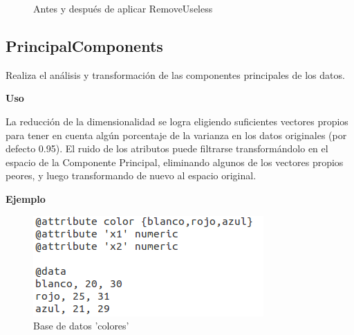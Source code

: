 	\begin{figure}[!htp]
	\centering
	\caption{Antes y después de aplicar RemoveUseless}
	\end{figure}




\newpage

	\subsection{PrincipalComponents}

	Realiza el análisis y transformación de las componentes principales de los datos.


	\begin{justify}
	\textbf{Uso} 
	\end{justify}

	La reducción de la dimensionalidad se logra eligiendo suficientes vectores propios para tener en cuenta algún porcentaje de la varianza en los datos originales (por defecto 0.95). El ruido de los atributos puede filtrarse transformándolo en el espacio de la Componente Principal, eliminando algunos de los vectores propios peores, y luego transformando de nuevo al espacio original.

	\begin{justify}
	\textbf{Ejemplo}
	\end{justify}

	
	\begin{figure}[!htp]
	\centering
	\includegraphics[scale=.42]{./figuras/image2.png}
	\caption{Base de datos 'colores'}
	\end{figure}
	
